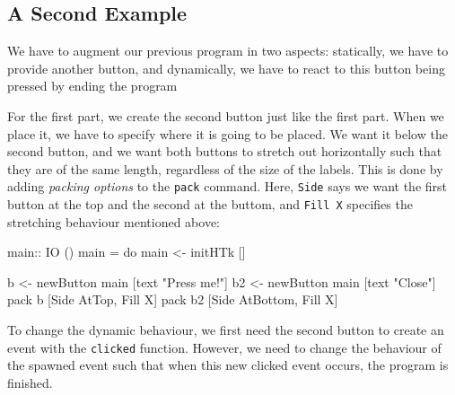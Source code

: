 \subsection{A Second Example}

\begin{comment}
\begin{code}
module Main where

import HTk    
import Random
\end{code}
\end{comment}

We have to augment our previous program in two aspects: statically, we
have to provide another button, and dynamically, we have to react to
this button being pressed by ending the program

For the first part, we create the second button just like the first
part. When we place it, we have to specify where it is going to be
placed.  We want it below the second button, and we want both buttons
to stretch out horizontally such that they are of the same length,
regardless of the size of the labels.  This is done by adding
\emph{packing options} to the \texttt{pack} command. Here,
\texttt{Side} says we want the first button at the top and the second
at the buttom, and \texttt{Fill X} specifies the stretching
behaviour mentioned above:

\begin{code}
main:: IO ()
main =
  do main <- initHTk []

     b <- newButton main [text "Press me!"]
     b2 <- newButton main [text "Close"]
     pack b [Side AtTop, Fill X]
     pack b2 [Side AtBottom, Fill X]
\end{code}

To change the dynamic behaviour, we first need the second button to
create an event with the \texttt{clicked} function. However, we need
to change the behaviour of the spawned event such that when this new
clicked event occurs, the program is finished. 

